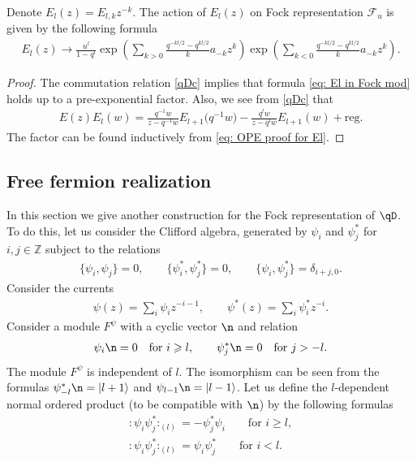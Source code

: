 \begin{Proposition} \label{E_l}
Denote $E_l(z) = E_{l, k} z^{-k}$. The action of $E_l(z)$ on Fock representation $\mathcal{F}_u$ is given by the following formula
\begin{gather} \label{eq: El in Fock mod}
E_l(z) \rightarrow \frac{u^l}{1-q^l} \exp \! \left( \sum_{k>0} \frac{q^{-kl/2}-q^{kl/2}}{k} a_{-k} z^k \right) \exp \! \left( \sum_{k<0} \frac{q^{-kl/2}-q^{kl/2}}{k} a_{-k} z^k \right).
\end{gather}
\begin{proof}
The commutation relation \eqref{qDc} implies that formula \eqref{eq: El in Fock mod} holds up to a pre-exponential factor. Also, we see from \eqref{qDc} that
\begin{gather} \label{eq: OPE proof for El}
E(z) E_l(w) = \frac{q^{-1}w}{z-q^{-1}w} E_{l+1}\big(q^{-1}w\big) - \frac{q^l w }{z-q^l w} E_{l+1}(w) + \mathrm{reg}.
\end{gather}
The factor can be found inductively from \eqref{eq: OPE proof for El}.
\end{proof}
\end{Proposition}

\subsection{Free fermion realization} \label{fermi}

In this section we give another construction for the Fock representation of $\qD$. To do this, let us consider the Clifford algebra, generated by $\psi_i$ and $\psi^*_j$ for $i,j \in \mathbb{Z}$ subject to the relations
\begin{gather*}
\{ \psi_i, \psi_j \} =0, \qquad \{ \psi^*_i, \psi^*_j \} =0, %
\qquad \{ \psi_i , \psi^*_j \} = \delta_{i+j, 0}. %
\end{gather*}
Consider the currents
\begin{gather*}
\psi(z) = \sum_{i} \psi_i z^{-i-1}, \qquad \psi^*(z) = \sum_i \psi^*_i z^{-i}.
\end{gather*}
Consider a module $F^\psi$ with a cyclic vector $\n$ and relation
\begin{gather*}
\psi_i \n = 0 \quad \text{for} \ i \geqslant l, \qquad \psi^*_j \n = 0 \quad \text{for} \ j > -l.
\end{gather*}
The module $F^\psi$ is independent of $l$. The isomorphism can be seen from the formulas $\psi^*_{-l} \n = | l+1 \rangle$ and $\psi_{l-1} \n = | l-1 \rangle$.
Let us define the $l$-dependent normal ordered product (to be compatible with $\n$) by the following formulas
\begin{gather}
: \! \psi_i \psi^*_j \! :_{(l)} = - \psi^*_j \psi_i \qquad \text{for } i \geqslant l, \label{norm1} \\
: \! \psi_i \psi^*_j \! :_{(l)} = \psi_i \psi^*_j \qquad \text{for } i < l. \label{norm2}
\end{gather}

